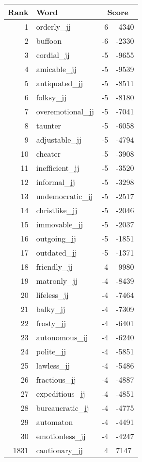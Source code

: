 \begin{longtable}[!htbp]{| rlr@{.}l |}
    \hline
    \textbf{Rank} & \textbf{Word} & \multicolumn{2}{c|}{\textbf{Score}} \\
    \hline
    \endhead
    1 & orderly\_jj & -6 & -4340 \\
    2 & buffoon & -6 & -2330 \\
    3 & cordial\_jj & -5 & -9655 \\
    4 & amicable\_jj & -5 & -9539 \\
    5 & antiquated\_jj & -5 & -8511 \\
    6 & folksy\_jj & -5 & -8180 \\
    7 & overemotional\_jj & -5 & -7041 \\
    8 & taunter & -5 & -6058 \\
    9 & adjustable\_jj & -5 & -4794 \\
    10 & cheater & -5 & -3908 \\
    11 & inefficient\_jj & -5 & -3520 \\
    12 & informal\_jj & -5 & -3298 \\
    13 & undemocratic\_jj & -5 & -2517 \\
    14 & christlike\_jj & -5 & -2046 \\
    15 & immovable\_jj & -5 & -2037 \\
    16 & outgoing\_jj & -5 & -1851 \\
    17 & outdated\_jj & -5 & -1371 \\
    18 & friendly\_jj & -4 & -9980 \\
    19 & matronly\_jj & -4 & -8439 \\
    20 & lifeless\_jj & -4 & -7464 \\
    21 & balky\_jj & -4 & -7309 \\
    22 & frosty\_jj & -4 & -6401 \\
    23 & autonomous\_jj & -4 & -6240 \\
    24 & polite\_jj & -4 & -5851 \\
    25 & lawless\_jj & -4 & -5486 \\
    26 & fractious\_jj & -4 & -4887 \\
    27 & expeditious\_jj & -4 & -4851 \\
    28 & bureaucratic\_jj & -4 & -4775 \\
    29 & automaton & -4 & -4491 \\
    30 & emotionless\_jj & -4 & -4247 \\
    1831 & cautionary\_jj & 4 & 7147 \\

\end{longtable}

